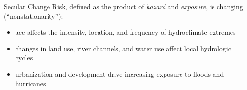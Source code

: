 \begin{block}{Secular Change}
  Risk, defined as the product of \emph{hazard} and \emph{exposure}, is changing (``nonstationarity''):
  \begin{itemize}
    \item \gls{acc} affects the intensity, location, and frequency of hydroclimate extremes \cite{Held:2006jo, OGorman:2009hj}
    \item changes in land use, river channels, and water use affect local hydrologic cycles \cite{Merz:2014gf}
    \item urbanization and development drive increasing exposure to floods \cite{Jongman:2012cr} and hurricanes \cite{Peduzzi:2012iq}
  \end{itemize}
\end{block}